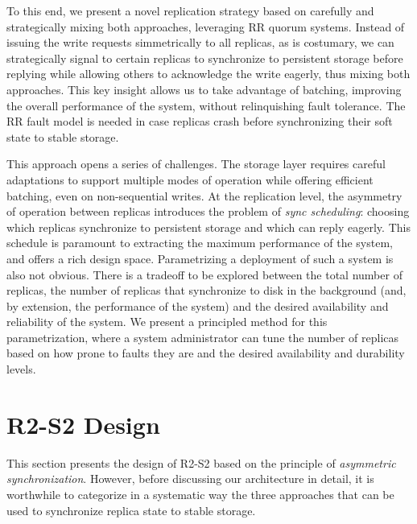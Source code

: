 To this end, we present a novel replication strategy based on
carefully and strategically mixing both approaches, leveraging
\ac{RR} quorum systems. Instead of issuing the write
requests simmetrically to all replicas, as is costumary, we can
strategically signal to certain replicas to synchronize to
persistent storage before replying while allowing others to
acknowledge the write eagerly, thus mixing both approaches. This
key insight allows us to take advantage of batching, improving the overall
performance of the system, without relinquishing fault tolerance.
The \ac{RR} fault model is needed in case replicas crash before
synchronizing their soft state to stable storage.

This approach opens a series of challenges. The storage layer
requires careful adaptations to support multiple modes of
operation while offering efficient batching, even on
non-sequential writes. At the replication level, the asymmetry of
operation between replicas introduces the problem of \emph{sync
scheduling}: choosing which replicas synchronize to persistent storage
and which can reply eagerly. This schedule is paramount to
extracting the maximum performance of the system, and offers a
rich design space. Parametrizing a deployment of such a system is
also not obvious. There is a tradeoff to be explored between the
total number of replicas, the number of replicas that synchronize
to disk in the background (and, by extension, the performance of
the system) and the desired availability and reliability of the
system. We present a principled method for this parametrization,
where a system administrator can tune the number of replicas
based on how prone to faults they are and the desired
availability and durability levels.

\section{\ac{R2-S2} Design}\label{sec:r2s2asymmetric}


This section presents the design of \ac{R2-S2}
based on the principle of \emph{asymmetric synchronization}. However,
before discussing our architecture in detail, it is worthwhile to
categorize in a systematic way the three approaches that can be used to synchronize
replica state to stable storage.


